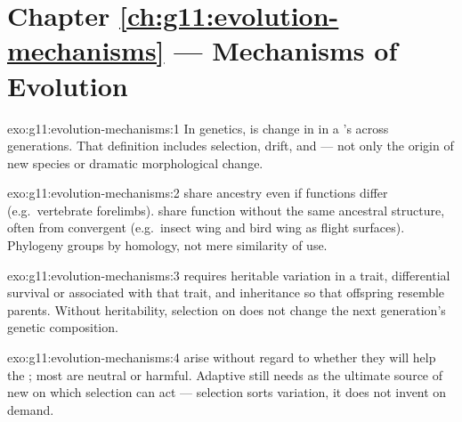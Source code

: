 \section*{Chapter \ref{ch:g11:evolution-mechanisms} --- Mechanisms of Evolution}

\begin{solution}{exo:g11:evolution-mechanisms:1}
In  genetics,  is change in  in a
's  across generations. That definition includes selection,
drift,  and  --- not only the origin of new species or
dramatic morphological change.
\end{solution}

\begin{solution}{exo:g11:evolution-mechanisms:2}
 share ancestry even if functions differ (e.g.\ vertebrate
forelimbs).  share function without the same ancestral
structure, often from convergent  (e.g.\ insect wing and bird wing as
flight surfaces). Phylogeny groups by homology, not mere similarity of use.
\end{solution}

\begin{solution}{exo:g11:evolution-mechanisms:3}
 requires heritable variation in a trait, differential
survival or  associated with that trait, and inheritance so that
offspring resemble parents. Without heritability, selection on  does
not change the next generation's genetic composition.
\end{solution}

\begin{solution}{exo:g11:evolution-mechanisms:4}
 arise without regard to whether they will help the ; most
are neutral or harmful. Adaptive  still needs  as the ultimate
source of new  on which selection can act --- selection sorts variation,
it does not invent  on demand.
\end{solution}

